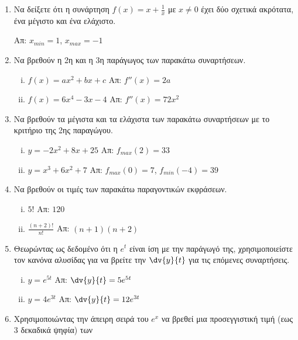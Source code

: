 \begin{enumerate}
  \item Να δείξετε ότι η συνάρτηση $ f(x) = x + \frac{1}{x} $ με $ x \neq 0 $ έχει δύο 
    σχετικά ακρότατα, ένα μέγιστο και ένα ελάχιστο. 

    \hfill Απ: $ x_{min} = 1$, \; $ x_{max}=-1  $ 

  \item Να βρεθούν η 2η και η 3η παράγωγος των παρακάτω συναρτήσεων.

    \begin{enumerate}[i)]
      \item $ f(x) = ax^{2}+bx+c $ \hfill Απ: $ f''(x)=2a $
      \item $ f(x) = 6x^{4}-3x-4 $ \hfill Απ: $ f''(x)=72x^{2} $ 
    \end{enumerate}

  \item Να βρεθούν τα μέγιστα και τα ελάχιστα των παρακάτω συναρτήσεων με το 
    κριτήριο της 2ης παραγώγου.

    \begin{enumerate}[i)]
      \item $ y = -2x^{2}+8x+25 $ \hfill Απ: $ f_{max}(2)=33 $
      \item $ y = x^{3}+6x^{2}+7 $ \hfill Απ: $ f_{max}(0)=7 $, $ f_{min}(-4)=39 $ 
    \end{enumerate}

  \item Να βρεθούν οι τιμές των παρακάτω παραγοντικών εκφράσεων.

    \begin{enumerate}[i)]
      \item $ 5! $ \hfill Απ: $ 120 $
      \item $ \frac{(n+2)!}{n!} $ \hfill Απ: $ (n+1)(n+2) $
    \end{enumerate}

  \item Θεωρώντας ως δεδομένο ότι η $ e^{t} $ είναι ίση με την παράγωγό της, 
    χρησιμοποιείστε τον κανόνα αλυσίδας για να βρείτε την $ \dv{y}{t} $ για τις 
    επόμενες συναρτήσεις.

    \begin{enumerate}[i)]
      \item $ y = e^{5t} $ \hfill Απ: $ \dv{y}{t} = 5e^{5t} $
      \item $ y = 4e^{3t} $ \hfill Απ: $ \dv{y}{t} = 12e^{3t} $ 
    \end{enumerate}

  \item Χρησιμοποιώντας την άπειρη σειρά του $ e^{x} $ να βρεθεί μια προσεγγιστική τιμή 
    (εως 3 δεκαδικά ψηφία) των 


\end{enumerate}
